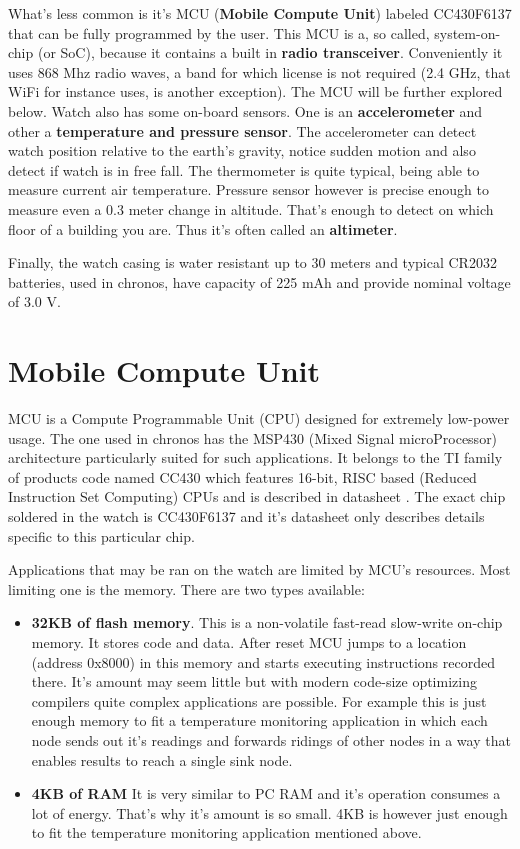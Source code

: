 What's less common is it's MCU ({\bf Mobile Compute Unit}) labeled
CC430F6137 that can be fully programmed by the user. This MCU is a, so
called, system-on-chip (or SoC), because it contains a built in {\bf
radio transceiver}. Conveniently it uses 868 Mhz radio waves, a band
for which license is not required (2.4 GHz, that WiFi for instance
uses, is another exception). The MCU will be further explored below.
Watch also has some on-board sensors.  One is an {\bf accelerometer}
and other a {\bf temperature and pressure sensor}. The accelerometer
can detect watch position relative to the earth's gravity, notice
sudden motion and also detect if watch is in free fall. The
thermometer is quite typical, being able to measure current air
temperature. Pressure sensor however is precise enough to measure even
a 0.3 meter change in altitude. That's enough to detect on which floor
of a building you are. Thus it's often called an {\bf altimeter}.

Finally, the watch casing is water resistant up to 30 meters and typical
CR2032 batteries, used in chronos, have capacity of 225 mAh and
provide nominal voltage of 3.0 V.

\section{Mobile Compute Unit}

MCU is a Compute Programmable Unit (CPU) designed for extremely
low-power usage. The one used in chronos has the MSP430 (Mixed Signal
microProcessor) architecture particularly suited for such
applications. It belongs to the TI family of products code named CC430
which features 16-bit, RISC based (Reduced Instruction Set Computing)
CPUs and is described in datasheet \cite{CC430ds}. The exact chip
soldered in the watch is CC430F6137 and it's datasheet
\cite{CC430F6137ds} only describes details specific to this particular
chip.

Applications that may be ran on the watch are limited by MCU's
resources. Most limiting one is the memory. There are two types
available:
\begin{itemize}
  \item {\bf 32KB of flash memory}. This is a non-volatile fast-read
    slow-write on-chip memory. It stores code and data. After reset
    MCU jumps to a location (address 0x8000) in this memory and starts
    executing instructions recorded there. It's amount may seem little
    but with
    modern code-size optimizing compilers quite complex applications
    are possible. For example this is just enough memory to fit a
    temperature monitoring application in which each node sends out
    it's readings and forwards ridings of other nodes in a way that
    enables results to reach a single sink node.
  \item {\bf 4KB of RAM} It is very similar to PC RAM and it's
    operation consumes a lot of energy. That's why it's amount is so
    small. 4KB is however just enough to fit the temperature monitoring
    application mentioned above.
\end{itemize}

